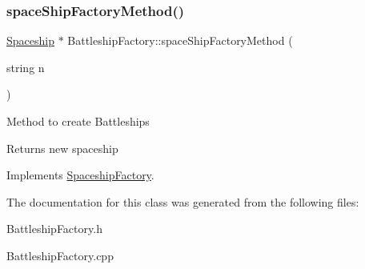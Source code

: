 \subsubsection{\texorpdfstring{space\+Ship\+Factory\+Method()}{spaceShipFactoryMethod()}}
{\footnotesize\ttfamily \hyperlink{classSpaceship}{Spaceship} $\ast$ Battleship\+Factory\+::space\+Ship\+Factory\+Method (\begin{DoxyParamCaption}\item[{string}]{n }\end{DoxyParamCaption})\hspace{0.3cm}{\ttfamily [virtual]}}

Method to create Battleships \begin{DoxyReturn}{Returns}
new spaceship 
\end{DoxyReturn}


Implements \hyperlink{classSpaceshipFactory_a70b50dd616cb16f50088eff9ca07cda9}{Spaceship\+Factory}.



The documentation for this class was generated from the following files\+:\begin{DoxyCompactItemize}
\item 
Battleship\+Factory.\+h\item 
Battleship\+Factory.\+cpp\end{DoxyCompactItemize}
